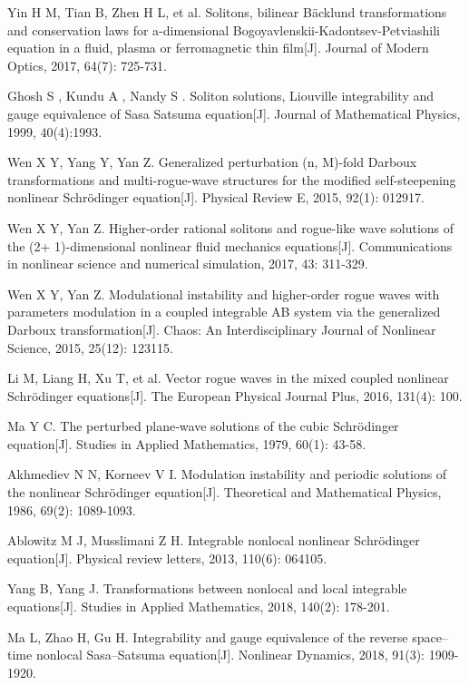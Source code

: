 \begin{thebibliography}{0}
Yin H M, Tian B, Zhen H L, et al. Solitons, bilinear Bäcklund transformations and conservation laws for a-dimensional Bogoyavlenskii-Kadontsev-Petviashili equation in a fluid, plasma or ferromagnetic thin film[J]. Journal of Modern Optics, 2017, 64(7): 725-731.

Ghosh S , Kundu A , Nandy S . Soliton solutions, Liouville integrability and gauge equivalence of Sasa Satsuma equation[J]. Journal of Mathematical Physics, 1999, 40(4):1993.

Wen X Y, Yang Y, Yan Z. Generalized perturbation (n, M)-fold Darboux transformations and multi-rogue-wave structures for the modified self-steepening nonlinear Schrödinger equation[J]. Physical Review E, 2015, 92(1): 012917.

Wen X Y, Yan Z. Higher-order rational solitons and rogue-like wave solutions of the (2+ 1)-dimensional nonlinear fluid mechanics equations[J]. Communications in nonlinear science and numerical simulation, 2017, 43: 311-329.

Wen X Y, Yan Z. Modulational instability and higher-order rogue waves with parameters modulation in a coupled integrable AB system via the generalized Darboux transformation[J]. Chaos: An Interdisciplinary Journal of Nonlinear Science, 2015, 25(12): 123115.

Li M, Liang H, Xu T, et al. Vector rogue waves in the mixed coupled nonlinear Schrödinger equations[J]. The European Physical Journal Plus, 2016, 131(4): 100.


Ma Y C. The perturbed plane‐wave solutions of the cubic Schrödinger equation[J]. Studies in Applied Mathematics, 1979, 60(1): 43-58.

Akhmediev N N, Korneev V I. Modulation instability and periodic solutions of the nonlinear Schrödinger equation[J]. Theoretical and Mathematical Physics, 1986, 69(2): 1089-1093.



Ablowitz M J, Musslimani Z H. Integrable nonlocal nonlinear Schrödinger equation[J]. Physical review letters, 2013, 110(6): 064105.

Yang B, Yang J. Transformations between nonlocal and local integrable equations[J]. Studies in Applied Mathematics, 2018, 140(2): 178-201.

Ma L, Zhao H, Gu H. Integrability and gauge equivalence of the reverse space–time nonlocal Sasa–Satsuma equation[J]. Nonlinear Dynamics, 2018, 91(3): 1909-1920.


\end{thebibliography}
